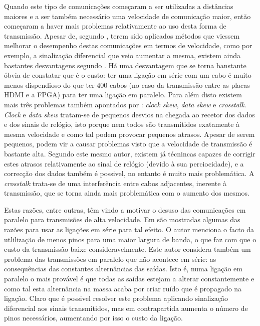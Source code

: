Quando este tipo de comunicações começaram a ser utilizadas a distâncias maiores e a ser também necessário uma velocidade de comunicação maior, então começaram a haver mais problemas relativamente ao uso desta forma de transmissão. Apesar de, segundo \cite{R032}, terem sido aplicados métodos que viessem melhorar o desempenho destas comunicações em termos de velocidade, como por exemplo, a sinalização diferencial que veio aumentar a mesma, existem ainda bastantes desvantagens segundo \cite{R012}. Há uma  desvantagem que se torna banstante óbvia de constatar que é o custo: ter uma ligação em série com um cabo é muito menos dispendioso do que ter 400 cabos (no caso da transmissão entre as placas HDMI e a FPGA) para ter uma ligação em paralelo. Para além disto existem mais três problemas também apontados por \cite{R012} : \textit{clock skew}, \textit{data skew} e \textit{crosstalk}. \textit{Clock} e \textit{data skew} tratam-se de pequenos desvios na chegada ao recetor dos dados e dos sinais de relógio, isto porque nem todos são transmitidos exatamente à mesma velocidade e como tal podem provocar pequenos atrasos. Apesar de serem pequenos, podem vir a causar problemas visto que a velocidade de transmissão é bastante alta. Segundo este mesmo autor, existem já técnincas capazes de corrigir estes atrasos relativamente ao sinal de relógio (devido à sua perciocidade), e a correcção dos dados também é possivel, no entanto é muito mais problemática. A \textit{crosstalk} trata-se de uma interferência entre cabos adjacentes, inerente à transmissão, que se torna ainda mais problemática com o aumento dos mesmos.

Estas razões, entre outras, têm vindo a motivar o desuso das comunicações em paralelo para transmisões de alta velocidade. Em \cite{R032} são mostradas algumas das razões para usar as ligações em série para tal efeito. O autor menciona o facto da utlilização de menos pinos para uma maior largura de banda, o que faz com que o custo da transmissão baixe consideravelmente. Este autor considera também um problema das transmissões em paralelo que não acontece em série: as consequências das constantes alternâncias das saídas. Isto é, numa ligação em paralelo o mais provável é que todas as saídas estejam a alterar constantemente e como tal esta alternância na massa acaba por criar ruído que é propagado na ligação. Claro que é possivel resolver este problema aplicando sinalização diferencial aos sinais transmitidos, mas em contrapartida aumenta o número de pinos necessários, aumentando por isso o custo da ligação.

